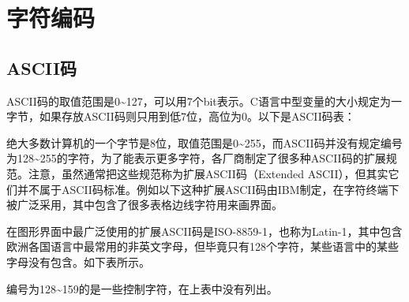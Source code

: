 

\chapter{字符编码}
%





\section{ASCII码}
%
ASCII码的取值范围是0\textasciitilde{}\BookSplit{}127，可以用7个bit表示。C语言中型变量的大小规定为一字节，如果存放ASCII码则只用到低7位，高位为0。以下是ASCII码表：




绝大多数计算机的一个字节是8位，取值范围是0\textasciitilde{}\BookSplit{}255，而ASCII码并没有规定编号为128\textasciitilde{}\BookSplit{}255的字符，为了能表示更多字符，各厂商制定了很多种ASCII码的扩展规范。注意，虽然通常把这些规范称为扩展ASCII码（Extended ASCII），但其实它们并不属于ASCII码标准。例如以下这种扩展ASCII码由IBM制定，在字符终端下被广泛采用，其中包含了很多表格边线字符用来画界面。




在图形界面中最广泛使用的扩展ASCII码是ISO-8859-1，也称为Latin-1，其中包含欧洲各国语言中最常用的非英文字母，但毕竟只有128个字符，某些语言中的某些字母没有包含。如下表所示。




编号为128\textasciitilde{}\BookSplit{}159的是一些控制字符，在上表中没有列出。



